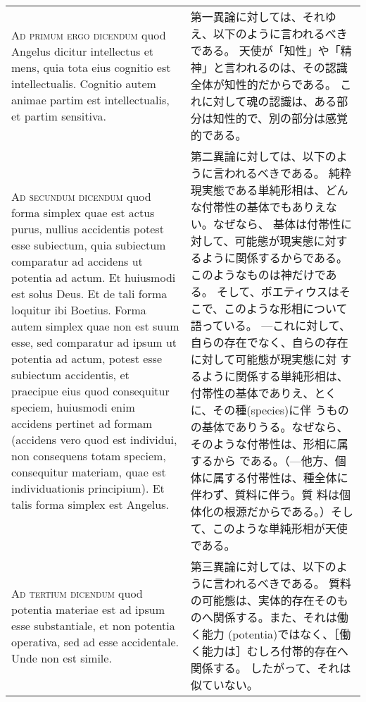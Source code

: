 \documentclass[10pt]{jsarticle} %
\begin{document}
\begin{longtable}{p{21em}p{21em}}
\\


{\scshape Ad primum ergo dicendum} quod Angelus dicitur
intellectus et mens, quia tota eius cognitio est
intellectualis. Cognitio autem animae partim est intellectualis, et
partim sensitiva.

&

第一異論に対しては、それゆえ、以下のように言われるべきである。
天使が「知性」や「精神」と言われるのは、その認識全体が知性的だからである。
 これに対して魂の認識は、ある部分は知性的で、別の部分は感覚的である。

\\


{\scshape Ad secundum dicendum} quod forma simplex quae
est actus purus, nullius accidentis potest esse subiectum, quia
subiectum comparatur ad accidens ut potentia ad actum. Et huiusmodi est
solus Deus. Et de tali forma loquitur ibi Boetius. Forma autem simplex
quae non est suum esse, sed comparatur ad ipsum ut potentia ad actum,
potest esse subiectum accidentis, et praecipue eius quod consequitur
speciem, huiusmodi enim accidens pertinet ad formam (accidens vero quod
est individui, non consequens totam speciem, consequitur materiam, quae
est individuationis principium). Et talis forma simplex est Angelus.

&

第二異論に対しては、以下のように言われるべきである。
純粋現実態である単純形相は、どんな付帯性の基体でもありえない。なぜなら、
 基体は付帯性に対して、可能態が現実態に対するように関係するからである。
このようなものは神だけである。
そして、ボエティウスはそこで、このような形相について語っている。
---これに対して、自らの存在でなく、自らの存在に対して可能態が現実態に対
 するように関係する単純形相は、付帯性の基体でありえ、とくに、その種(species)に伴
 うものの基体でありうる。なぜなら、そのような付帯性は、形相に属するから
 である。（---他方、個体に属する付帯性は、種全体に伴わず、質料に伴う。質
 料は個体化の根源だからである。）そして、このような単純形相が天使である。

\\


{\scshape Ad tertium dicendum} quod potentia materiae
est ad ipsum esse substantiale, et non potentia operativa, sed ad esse
accidentale. Unde non est simile.

&

第三異論に対しては、以下のように言われるべきである。
質料の可能態は、実体的存在そのものへ関係する。また、それは働く能力
 (potentia)ではなく、［働く能力は］むしろ付帯的存在へ関係する。
したがって、それは似ていない。


\end{longtable}
\newpage
\end{document}
